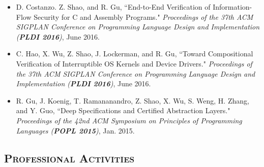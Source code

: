 \documentclass[10pt]{article}
\renewcommand{\section}[1]{
	\vspace{-5pt}
   	\subsection*{\scshape  \bfseries #1}
   }
\newenvironment{innerlist}[1][\enskip\textbullet]%
        {\begin{itemize}[#1,leftmargin=25pt,parsep=0pt,itemsep=2pt,topsep=2pt,partopsep=0pt]}
        {\end{itemize}}
\begin{document}
\begin{innerlist}
\vspace{.1in}

\item[] D. Costanzo. Z. Shao, and R. Gu, ``End-to-End Verification of Information-Flow Security for C and Assembly Programs." \emph{Proceedings of the 37th ACM SIGPLAN Conference on Programming Language Design and Implementation (\textbf{PLDI 2016})}, June 2016.

\vspace{.1in}


\item[] C. Hao, X. Wu, Z. Shao, J. Lockerman, and R. Gu, ``Toward Compositional Verification of Interruptible OS Kernels and Device Drivers." \emph{Proceedings of the 37th ACM SIGPLAN Conference on Programming Language Design and Implementation (\textbf{PLDI 2016})}, June 2016.

\vspace{.1in}

\item[] R. Gu, J. Koenig, T. Ramananandro, Z. Shao, X. Wu, S. Weng, H. Zhang, and Y. Guo, ``Deep Specifications and Certified Abstraction Layers." \emph{Proceedings of the 42nd ACM Symposium on Principles of Programming Languages (\textbf{POPL 2015})}, Jan. 2015.

\end{innerlist}

\section{Professional Activities}
\end{document}
